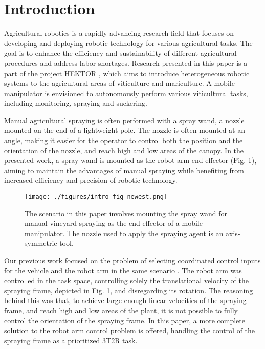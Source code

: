 \section{Introduction}

Agricultural robotics is a rapidly advancing research field that focuses on developing and deploying robotic technology for various agricultural tasks. The goal is to enhance the efficiency and sustainability of different agricultural procedures and address labor shortages. Research presented in this paper is a part of the project HEKTOR \cite{hektor, Goricanec2021}, which aims to introduce heterogeneous robotic systems to the agricultural areas of viticulture and mariculture. A mobile manipulator is envisioned to autonomously perform various viticultural tasks, including monitoring, spraying and suckering.  

Manual agricultural spraying is often performed with a spray wand, a nozzle mounted on the end of a lightweight pole. The nozzle is often mounted at an angle, making it easier for the operator to control both the position and the orientation of the nozzle, and reach high and low areas of the canopy. In the presented work, a spray wand is mounted as the robot arm end-effector (Fig. \ref{fig:intro_fig}), aiming to maintain the advantages of manual spraying while benefiting from increased efficiency and precision of robotic technology.

\begin{figure}[!ht]
\centering
\texttt{[image: ./figures/intro\_fig\_newest.png]}
\caption{
The scenario in this paper involves mounting the spray wand for manual vineyard spraying as the end-effector of a mobile manipulator. The nozzle used to apply the spraying agent is an axis-symmetric tool. 
}
\label{fig:intro_fig}
\end{figure}

Our previous work focused on the problem of selecting coordinated control inputs for the vehicle and the robot arm in the same scenario \cite{Vatavuk2022}. The robot arm was controlled in the task space, controlling solely the translational velocity of the spraying frame, depicted in Fig. \ref{fig:intro_fig}, and disregarding its rotation. The reasoning behind this was that, to achieve large enough linear velocities of the spraying frame, and reach high and low areas of the plant, it is not possible to fully control the orientation of the spraying frame. In this paper, a more complete solution to the robot arm control problem is offered, handling the control of the spraying frame as a prioritized 3T2R task.

